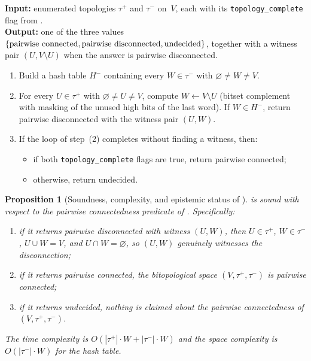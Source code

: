 \documentclass[11pt,a4paper]{article}
\theoremstyle{plain}
\newtheorem{proposition}[theorem]{Proposition}
\theoremstyle{definition}
\newcommand{\taufwd}{\tau^{+}}
\newcommand{\taubwd}{\tau^{-}}
\begin{document}
\begin{algorithm}
\caption{Pairwise connectedness check}%
\label{alg:pairwise}
\textbf{Input:} enumerated topologies $\taufwd$ and $\taubwd$ on~$V$, each
with its \texttt{topology\_complete} flag from . \\
\textbf{Output:} one of the three values $\{\textup{pairwise connected},
\textup{pairwise disconnected}, \textup{undecided}\}$, together with a
witness pair $(U, V \setminus U)$ when the answer is \textup{pairwise
disconnected}.
\begin{enumerate}[leftmargin=2em, label=\textup{(\arabic*)}]
  \item Build a hash table $H^{-}$ containing every $W \in \taubwd$ with
        $\varnothing \neq W \neq V$.
  \item For every $U \in \taufwd$ with $\varnothing \neq U \neq V$, compute
        $W \leftarrow V \setminus U$ (bitset complement with masking of the
        unused high bits of the last word).  If $W \in H^{-}$, return
        \textup{pairwise disconnected} with the witness pair $(U, W)$.
  \item If the loop of step~(2) completes without finding a witness, then:
  \begin{itemize}[leftmargin=1.5em]
    \item if both \texttt{topology\_complete} flags are \textup{true},
          return \textup{pairwise connected};
    \item otherwise, return \textup{undecided}.
  \end{itemize}
\end{enumerate}
\end{algorithm}

\begin{proposition}[Soundness, complexity, and epistemic status of
]%
\label{prop:pairwise-correct}
 is sound with respect to the pairwise connectedness
predicate of .  Specifically:
\begin{enumerate}[leftmargin=2em, label=\textup{(\roman*)}]
  \item if it returns \textup{pairwise disconnected} with witness $(U, W)$,
        then $U \in \taufwd$, $W \in \taubwd$, $U \cup W = V$, and
        $U \cap W = \varnothing$, so $(U, W)$ genuinely witnesses the
        disconnection;
  \item if it returns \textup{pairwise connected}, the bitopological space
        $(V, \taufwd, \taubwd)$ is pairwise connected;
  \item if it returns \textup{undecided}, nothing is claimed about the
        pairwise connectedness of $(V, \taufwd, \taubwd)$.
\end{enumerate}
The time complexity is $O(|\taufwd| \cdot W + |\taubwd| \cdot W)$ and the
space complexity is $O(|\taubwd| \cdot W)$ for the hash table.
\end{proposition}
\end{document}

